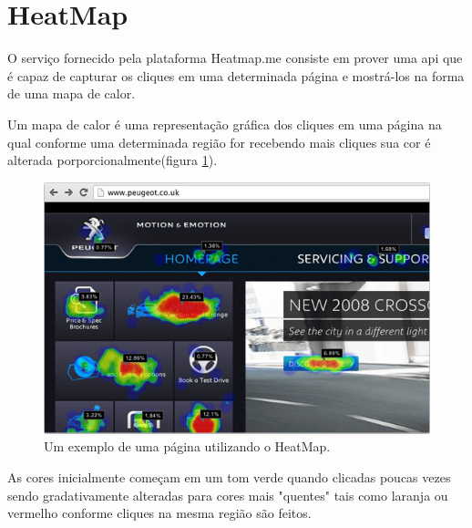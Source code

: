 \section{HeatMap}
\par O serviço fornecido pela plataforma Heatmap.me consiste em prover uma api que é capaz de capturar os cliques em uma determinada página e mostrá-los na forma de uma mapa de calor.
\par Um mapa de calor é uma representação gráfica dos cliques em uma página na qual conforme uma determinada região for recebendo mais cliques sua cor é alterada porporcionalmente(figura \ref{fig:heatmap_explanation}).
\begin{figure}[htb]
\centering
\includegraphics[width=15cm]{figuras/heatmap_explanation}
\caption{\label{fig:heatmap_explanation} Um exemplo de uma página utilizando o HeatMap.}
\end{figure}
\par As cores inicialmente começam em um tom verde quando clicadas poucas vezes sendo gradativamente alteradas para cores mais "quentes" tais como laranja ou vermelho conforme cliques na mesma região são feitos.